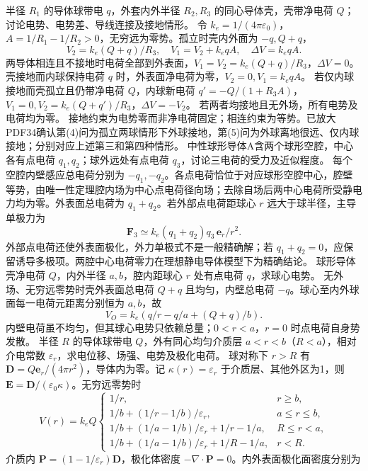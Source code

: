 \problemtext 半径 $R_1$ 的导体球带电 $q$，外套内外半径 $R_2,R_3$ 的同心导体壳，壳带净电荷 $Q$；讨论电势、电势差、导线连接及接地情形。
\workings 令 $k_e=1/(4\pi\varepsilon_0)$，$A=1/R_1-1/R_2>0$，无穷远为零势。孤立时壳内外面为 $-q,Q+q$，
\[
V_2=k_e(Q+q)/R_3,\quad V_1=V_2+k_eqA,\quad \Delta V=k_eqA.
\]
两导体相连且不接地时电荷全部到外表面，$V_1=V_2=k_e(Q+q)/R_3$，$\Delta V=0$。
壳接地而内球保持电荷 $q$ 时，外表面净电荷为零，$V_2=0,V_1=k_eqA$。
若仅内球接地而壳孤立且仍带净电荷 $Q$，内球新电荷 $q'=-Q/(1+R_3A)$，$V_1=0,V_2=k_e(Q+q')/R_3$，$\Delta V=-V_2$。
若两者均接地且无外场，所有电势及电荷均为零。
\crosscheck 接地约束为电势零而非净电荷固定；相连约束为等势。已放大PDF34确认第(4)问为孤立两球情形下外球接地，第(5)问为外球离地很远、仅内球接地；分别对应上述第三和第四种情形。
\problemtext 中性球形导体A含两个球形空腔，中心各有点电荷 $q_1,q_2$；球外远处有点电荷 $q_3$，讨论三电荷的受力及近似程度。
\workings 每个空腔内壁感应总电荷分别为 $-q_1,-q_2$。各点电荷恰位于对应球形空腔中心，腔壁等势，由唯一性定理腔内场为中心点电荷径向场；去除自场后两中心电荷所受静电力均为零。外表面总电荷为 $q_1+q_2$。若外部点电荷距球心 $r$ 远大于球半径，主导单极力为
\[
\bm F_3\simeq k_e(q_1+q_2)q_3\,\bm e_r/r^2.
\]
\crosscheck 外部点电荷还使外表面极化，外力单极式不是一般精确解；若 $q_1+q_2=0$，应保留诱导多极项。两腔中心电荷零力在理想静电导体模型下为精确结论。
\problemtext 球形导体壳净电荷 $Q$，内外半径 $a,b$，腔内距球心 $r$ 处有点电荷 $q$，求球心电势。
\workings 无外场、无穷远零势时壳外表面总电荷 $Q+q$ 且均匀，内壁总电荷 $-q$。球心至内外球面每一电荷元距离分别恒为 $a,b$，故
\[
V_O=k_e\left(q/r-q/a+(Q+q)/b\right).
\]
\crosscheck 内壁电荷虽不均匀，但其球心电势只依赖总量；$0<r<a$，$r=0$ 时点电荷自身势发散。
\problemtext 半径 $R$ 的导体球带电 $Q$，外有同心均匀介质层 $a<r<b$（$R<a$），相对介电常数 $\varepsilon_r$，求电位移、场强、电势及极化电荷。
\workings 球对称下 $r>R$ 有 $\bm D=Q\bm e_r/(4\pi r^2)$，导体内为零。记 $\kappa(r)=\varepsilon_r$ 于介质层、其他外区为1，则 $\bm E=\bm D/(\varepsilon_0\kappa)$。无穷远零势时
\[
V(r)=k_eQ\begin{cases}
1/r,&r\ge b,\\
1/b+(1/r-1/b)/\varepsilon_r,&a\le r\le b,\\
1/b+(1/a-1/b)/\varepsilon_r+1/r-1/a,&R\le r<a,\\
1/b+(1/a-1/b)/\varepsilon_r+1/R-1/a,&r<R.
\end{cases}
\]
介质内 $\bm P=(1-1/\varepsilon_r)\bm D$，极化体密度 $-\nabla\cdot\bm P=0$。内外表面极化面密度分别为
